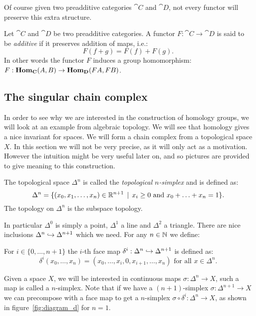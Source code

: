 Of course given two preadditive categories $\cat{C}$ and $\cat{D}$, not every functor will preserve this extra structure.
\begin{definition}
	Let $\cat{C}$ and $\cat{D}$ be two preadditive categories. A functor $F: \cat{C} \to \cat{D}$ is said to be \emph{additive} if it preserves addition of maps, i.e.:
	$$ F(f + g) = F(f) + F(g). $$
	In other words the functor $F$ induces a group homomorphism: $F : \mathbf{Hom}_{\mathbf{C}}(A, B) \to \mathbf{Hom}_{\mathbf{D}}(FA, FB)$.
\end{definition}

\subsection{The singular chain complex}
In order to see why we are interested in the construction of homology groups, we will look at an example from algebraic topology. We will see that homology gives a nice invariant for spaces. We will form a chain complex from a topological space $X$. In this section we will not be very precise, as it will only act as a motivation. However the intuition might be very useful later on, and so pictures are provided to give meaning to this construction.

\begin{definition}
	The topological space $\Delta^n$ is called the \emph{topological $n$-simplex} and is defined as:
	$$ \Delta^n = \{(x_0, x_1, \ldots, x_n) \in \mathbb{R}^{n+1} \,\mid\, x_i \geq 0 \text{ and } x_0 + \ldots + x_n = 1 \}.$$
	The topology on $\Delta^n$ is the subspace topology.
\end{definition}

In particular $\Delta^0$ is simply a point, $\Delta^1$ a line and $\Delta^2$ a triangle. There are nice inclusions $\Delta^n \hookrightarrow \Delta^{n+1}$ which we need. For any $n \in \mathbb{N}$ we define:
\begin{definition}
	For $i \in \{0, \ldots, n+1\}$ the $i$-th face map $\delta^i : \Delta^n \hookrightarrow \Delta^{n+1}$ is defined as:
	$$ \delta^i (x_0, \ldots, x_n) = (x_0, \ldots, x_{i}, 0, x_{i+1}, \ldots, x_n) \text{ for all } x \in \Delta^n.$$
\end{definition}

Given a space $X$, we will be interested in continuous maps $\sigma : \Delta^n \to X$, such a map is called a $n$-simplex. Note that if we have a $(n+1)$-simplex $\sigma : \Delta^{n+1} \to X$ we can precompose with a face map to get a $n$-simplex $\sigma \circ \delta^i : \Delta^n \to X$, as shown in figure~\ref{fig:diagram_d} for $n=1$.

